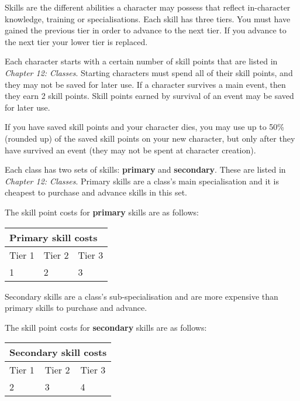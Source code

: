 \documentclass{scrbook}
\begin{document}
Skills are the different abilities a character may possess that reflect in-character knowledge, training or specialisations. Each skill has three tiers. You must have gained the previous tier in order to advance to the next tier. If you advance to the next tier your lower tier is replaced.

Each character starts with a certain number of skill points that are listed in \textit{Chapter 12: Classes}. Starting characters must spend all of their skill points, and they may not be saved for later use. If a character survives a main event, then they earn 2 skill points. Skill points earned by survival of an event may be saved for later use.

If you have saved skill points and your character dies, you may use up to 50\% (rounded up) of the saved skill points on your new character, but only after they have survived an event (they may not be spent at character creation).

Each class has two sets of skills: \textbf{primary} and \textbf{secondary}. These are listed in \textit{Chapter 12: Classes}. Primary skills are a class's main specialisation and it is cheapest to purchase and advance skills in this set.

The skill point costs for \textbf{primary} skills are as follows:

\begin{table}
\begin{tabular}{|l|l|l|} \hline 
\multicolumn{3}{|l|}{Primary skill costs} \\
 \hline Tier 1 & Tier 2 & Tier 3 \\
 \hline 1 & 2 & 3 \\
 \hline \end{tabular}

\end{table}

Secondary skills are a class's sub-specialisation and are more expensive than primary skills to purchase and advance.

The skill point costs for \textbf{secondary} skills are as follows:

\begin{table}
\begin{tabular}{|l|l|l|} \hline 
\multicolumn{3}{|l|}{Secondary skill costs} \\
 \hline Tier 1 & Tier 2 & Tier 3 \\
 \hline 2 & 3 & 4 \\
 \hline \end{tabular}

\end{table}
\end{document}
